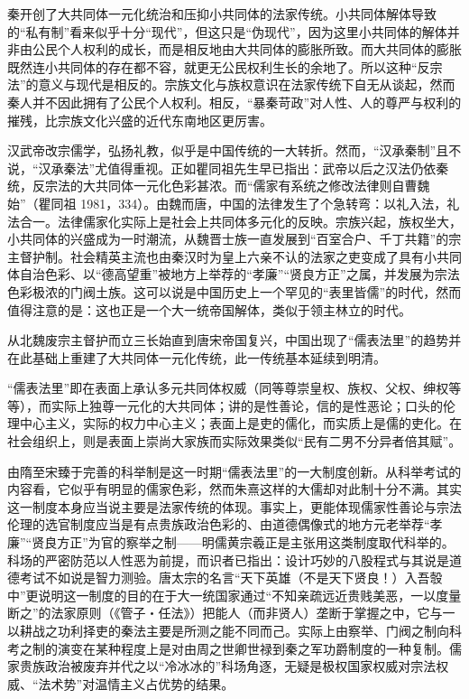 \documentclass[a4paper,12pt,punct=kaiming]{ctexart}
\begin{document}
秦开创了大共同体一元化统治和压抑小共同体的法家传统。小共同体解体导致的“私有制”看来似乎十分“现代”，但这只是“伪现代”，因为这里小共同体的解体并非由公民个人权利的成长，而是相反地由大共同体的膨胀所致。而大共同体的膨胀既然连小共同体的存在都不容，就更无公民权利生长的余地了。所以这种“反宗法”的意义与现代是相反的。宗族文化与族权意识在法家传统下自无从谈起，然而秦人并不因此拥有了公民个人权利。相反，“暴秦苛政”对人性、人的尊严与权利的摧残，比宗族文化兴盛的近代东南地区更厉害。

汉武帝改宗儒学，弘扬礼教，似乎是中国传统的一大转折。然而，“汉承秦制”且不说，“汉承秦法”尤值得重视。正如瞿同祖先生早已指出：武帝以后之汉法仍依秦统，反宗法的大共同体一元化色彩甚浓。而“儒家有系统之修改法律则自曹魏始”（瞿同祖 1981，334）。由魏而唐，中国的法律发生了个急转弯：以礼入法，礼法合一。法律儒家化实际上是社会上共同体多元化的反映。宗族兴起，族权坐大，小共同体的兴盛成为一时潮流，从魏晋士族一直发展到“百室合户、千丁共籍”的宗主督护制。社会精英主流也由秦汉时为皇上六亲不认的法家之吏变成了具有小共同体自治色彩、以“德高望重”被地方上举荐的“孝廉”“贤良方正”之属，并发展为宗法色彩极浓的门阀土族。这可以说是中国历史上一个罕见的“表里皆儒”的时代，然而值得注意的是：这也正是一个大一统帝国解体，类似于领主林立的时代。

从北魏废宗主督护而立三长始直到唐宋帝国复兴，中国出现了“儒表法里”的趋势并在此基础上重建了大共同体一元化传统，此一传统基本延续到明清。

“儒表法里”即在表面上承认多元共同体权威（同等尊崇皇权、族权、父权、绅权等等），而实际上独尊一元化的大共同体；讲的是性善论，信的是性恶论；口头的伦理中心主义，实际的权力中心主义；表面上是吏的儒化，而实质上是儒的吏化。在社会组织上，则是表面上崇尚大家族而实际效果类似“民有二男不分异者倍其赋”。

由隋至宋臻于完善的科举制是这一时期“儒表法里”的一大制度创新。从科举考试的内容看，它似乎有明显的儒家色彩，然而朱熹这样的大儒却对此制十分不满。其实这一制度本身应当说主要是法家传统的体现。事实上，更能体现儒家性善论与宗法伦理的选官制度应当是有点贵族政治色彩的、由道德偶像式的地方元老举荐“孝廉”“贤良方正”为官的察举之制——明儒黄宗羲正是主张用这类制度取代科举的。科场的严密防范以人性恶为前提，而识者已指出：设计巧妙的八股程式与其说是道德考试不如说是智力测验。唐太宗的名言“天下英雄（不是天下贤良！）入吾彀中”更说明这一制度的目的在于大一统国家通过“不知亲疏远近贵贱美恶，一以度量断之”的法家原则（《管子・任法》）把能人（而非贤人）垄断于掌握之中，它与一以耕战之功利择吏的秦法主要是所测之能不同而己。实际上由察举、门阀之制向科考之制的演变在某种程度上是对由周之世卿世禄到秦之军功爵制度的一种复制。儒家贵族政治被废弃并代之以“冷冰冰的”科场角逐，无疑是极权国家权威对宗法权威、“法术势”对温情主义占优势的结果。
\end{document}

